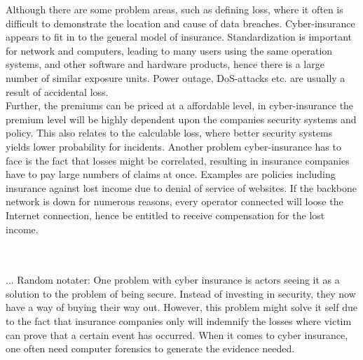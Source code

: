     
 Although there are some problem areas, such as defining loss, where it often is difficult to demonstrate the location and cause of data breaches. Cyber-insurance appears to fit in to the general model of insurance. Standardization is important for network and computers, leading to many users using the same operation systems, and other software and hardware products, hence there is a large number of similar exposure units. Power outage, DoS-attacks etc. are usually a result of accidental loss.
 \\ Further, the premiums can be priced at a affordable level, in cyber-insurance the premium level will be highly dependent upon the companies security systems and policy. This also relates to the calculable loss, where better security systems yields lower probability for incidents. \cite{robinson2012incentives}
 Another problem cyber-insurance has to face is the fact that losses might be correlated, resulting in insurance companies have to pay large numbers of claims at once. Examples are policies including insurance against lost income due to denial of service of websites. If the backbone network is down for numerous reasons, every operator connected will loose the Internet connection, hence be entitled to receive compensation for the lost income.   
 
   
 



\\
\\
... Random notater: One problem with cyber insurance is actors seeing it as a solution to the problem of being secure. Instead of investing in security, they now have a way of buying their way out. However, this problem might solve it self due to the fact that insurance companies only will indemnify the losses where victim can prove that a certain event has occurred. When it comes to cyber insurance, one often need computer forensics to generate the evidence needed. 









